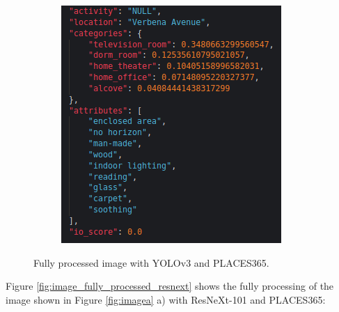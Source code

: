 \begin{figure}[H]
\begin{subfigure}{0.45\textwidth}
      \includegraphics[width=\textwidth]{Sections/4InitialWork/4_images_random/process2.png}
      \end{subfigure}
      \caption{Fully processed image with YOLOv3 and PLACES365.}
      \label{fig:image_fully_processed}
      \end{figure}



      Figure \ref{fig:image_fully_processed_resnext} shows the fully processing of the image shown in Figure \ref{fig:imagea} a) with ResNeXt-101 and PLACES365:
       
